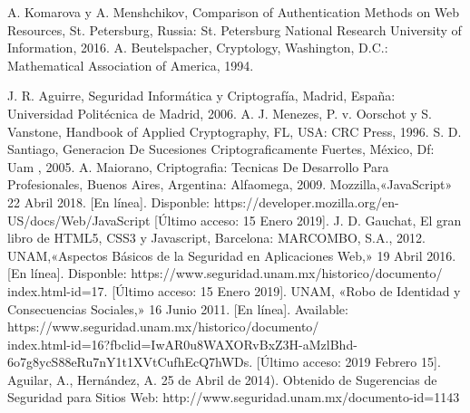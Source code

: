 \documentclass[12pt, a4paper, titlepage]{report}
\begin{document}
	\newpage

    \begin{thebibliography}{20}
	     A. Komarova y A. Menshchikov, Comparison of Authentication Methods on Web Resources, St. Petersburg, Russia: St. Petersburg National Research University of Information, 2016. 
		A. Beutelspacher, Cryptology, Washington, D.C.: Mathematical Association of America, 1994.
        
         J. R. Aguirre, Seguridad Informática y Criptografía, Madrid, España: Universidad Politécnica de Madrid, 2006.
        A. J. Menezes, P. v. Oorschot y S. Vanstone, Handbook of Applied Cryptography, FL, USA: CRC Press, 1996. %
         S. D. Santiago, Generacion De Sucesiones Criptograficamente Fuertes, México, Df: Uam , 2005.
         A. Maiorano, Criptografia: Tecnicas De Desarrollo Para Profesionales, Buenos Aires, Argentina: Alfaomega, 2009.
		Mozzilla,«JavaScript» 22 Abril 2018. [En línea]. Disponble:
		https://developer.mozilla.org/en-US/docs/Web/JavaScript [Último acceso: 15 Enero 2019].
		J. D. Gauchat, El gran libro de HTML5, CSS3 y Javascript, Barcelona: MARCOMBO, S.A., 2012. %
		 UNAM,«Aspectos Básicos de la Seguridad en Aplicaciones Web,» 19 Abril 2016. [En línea]. Disponble: https://www.seguridad.unam.mx/historico/documento/\\index.html-id=17. [Último acceso: 15 Enero 2019].
		UNAM, «Robo de Identidad y Consecuencias Sociales,» 16 Junio 2011. [En línea]. Available: https://www.seguridad.unam.mx/historico/documento/\\index.html-id=16?fbclid=IwAR0u8WAXORvBxZ3H-aMzlBhd-6o7g8ycS88eRu7nY1t1XVtCufhEcQ7hWDs. [Último acceso: 2019 Febrero 15].
		 Aguilar, A., Hernández, A. 25 de Abril de 2014). Obtenido de Sugerencias de Seguridad para Sitios Web: http://www.seguridad.unam.mx/documento-id=1143

\end{thebibliography}
\end{document}

